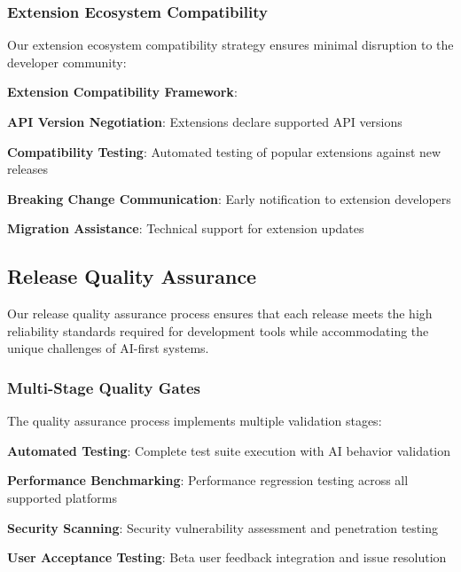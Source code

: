 \subsubsection*{Extension Ecosystem Compatibility}

Our extension ecosystem compatibility strategy ensures minimal disruption to the developer community:

\begin{alertbox}
\textbf{Extension Compatibility Framework}:
\begin{compactlist}
    \item \textbf{API Version Negotiation}: Extensions declare supported API versions
    \item \textbf{Compatibility Testing}: Automated testing of popular extensions against new releases
    \item \textbf{Breaking Change Communication}: Early notification to extension developers
    \item \textbf{Migration Assistance}: Technical support for extension updates
\end{compactlist}
\end{alertbox}

\subsection*{Release Quality Assurance}

Our release quality assurance process ensures that each release meets the high reliability standards required for development tools while accommodating the unique challenges of AI-first systems.

\subsubsection*{Multi-Stage Quality Gates}

The quality assurance process implements multiple validation stages:

\begin{compactlist}
    \item \textbf{Automated Testing}: Complete test suite execution with AI behavior validation
    \item \textbf{Performance Benchmarking}: Performance regression testing across all supported platforms
    \item \textbf{Security Scanning}: Security vulnerability assessment and penetration testing
    \item \textbf{User Acceptance Testing}: Beta user feedback integration and issue resolution
\end{compactlist}


